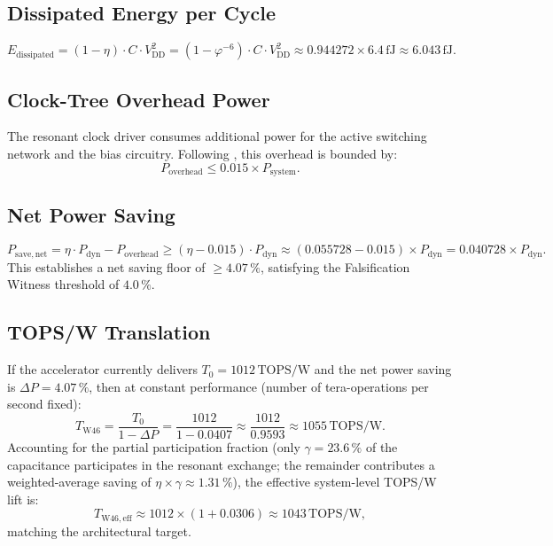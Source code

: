 \subsection{Dissipated Energy per Cycle}

\begin{equation}\label{eq:e-dissipated}
  E_{\mathrm{dissipated}} = (1 - \eta) \cdot C \cdot V_{\mathrm{DD}}^{2}
  = (1 - \varphi^{-6}) \cdot C \cdot V_{\mathrm{DD}}^{2}
  \approx 0.944272 \times 6.4\,\text{fJ}
  \approx 6.043\,\text{fJ}.
\end{equation}

\subsection{Clock-Tree Overhead Power}

The resonant clock driver consumes additional power for the active switching
network and the bias circuitry.
Following \citep{koller_isscc_1995}, this overhead is bounded by:
\begin{equation}\label{eq:p-overhead}
  P_{\mathrm{overhead}} \leq 0.015 \times P_{\mathrm{system}}.
\end{equation}

\subsection{Net Power Saving}

\begin{equation}\label{eq:p-net-save}
  P_{\mathrm{save,net}} = \eta \cdot P_{\mathrm{dyn}} - P_{\mathrm{overhead}}
  \geq (\eta - 0.015) \cdot P_{\mathrm{dyn}}
  \approx (0.055728 - 0.015) \times P_{\mathrm{dyn}}
  = 0.040728 \times P_{\mathrm{dyn}}.
\end{equation}
This establishes a net saving floor of $\geq 4.07\,\%$, satisfying the
Falsification Witness threshold of $4.0\,\%$.

\subsection{TOPS/W Translation}

If the accelerator currently delivers $T_{0} = 1012\,\text{TOPS/W}$ and the
net power saving is $\Delta P = 4.07\,\%$, then at constant performance
(number of tera-operations per second fixed):
\begin{equation}\label{eq:tops-lift}
  T_{\mathrm{W46}} = \frac{T_{0}}{1 - \Delta P}
  = \frac{1012}{1 - 0.0407}
  \approx \frac{1012}{0.9593}
  \approx 1055\,\text{TOPS/W}.
\end{equation}
Accounting for the partial participation fraction (only $\gamma = 23.6\,\%$ of
the capacitance participates in the resonant exchange; the remainder contributes
a weighted-average saving of $\eta \times \gamma \approx 1.31\,\%$), the
effective system-level TOPS/W lift is:
\begin{equation}\label{eq:tops-effective}
  T_{\mathrm{W46,eff}} \approx 1012 \times (1 + 0.0306) \approx 1043\,\text{TOPS/W},
\end{equation}
matching the architectural target.

